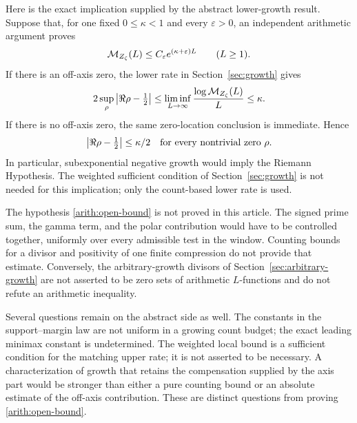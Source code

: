 Here is the exact implication supplied by the abstract
lower-growth result. Suppose that, for one fixed
\(0\le\kappa<1\) and every \(\varepsilon>0\), an independent
arithmetic argument proves
\begin{equation}\label{arith:open-bound}
 \mathcal M_{Z_\zeta}(L)\le
 C_\varepsilon e^{(\kappa+\varepsilon)L}
 \qquad(L\ge1).
\end{equation}
If there is an off-axis zero, the lower rate in
Section~\ref{sec:growth} gives
\[
 2\sup_\rho\left|\Re\rho-\tfrac12\right|
 \le\liminf_{L\to\infty}\frac{\log\mathcal M_{Z_\zeta}(L)}L
 \le\kappa.
\]
If there is no off-axis zero, the same zero-location
conclusion is immediate. Hence
\begin{equation}\label{arith:strip}
 \left|\Re\rho-\tfrac12\right|\le\kappa/2
 \quad\hbox{for every nontrivial zero } \rho.
\end{equation}
In particular, subexponential negative growth would imply
the Riemann Hypothesis. The weighted sufficient condition
of Section~\ref{sec:growth} is not needed for this
implication; only the count-based lower rate is used.

The hypothesis \eqref{arith:open-bound} is not proved in
this article. The signed prime sum, the gamma term, and
the polar contribution would have to be controlled
together, uniformly over every admissible test in the
window. Counting bounds for a divisor and positivity of
one finite compression do not provide that estimate.
Conversely, the arbitrary-growth divisors of
Section~\ref{sec:arbitrary-growth} are not asserted to be
zero sets of arithmetic \(L\)-functions and do not refute
an arithmetic inequality.

Several questions remain on the abstract side as well.
The constants in the support--margin law are not uniform
in a growing count budget; the exact leading minimax
constant is undetermined. The weighted local bound is a
sufficient condition for the matching upper rate; it is
not asserted to be necessary. A characterization of growth that
retains the compensation supplied by the axis part
would be stronger than either a pure counting bound
or an absolute estimate of the off-axis contribution.
These are distinct questions from proving
\eqref{arith:open-bound}.
